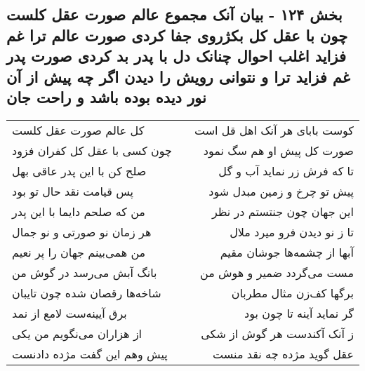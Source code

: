 \begin{center}
\section*{بخش ۱۲۴ - بیان آنک مجموع عالم صورت عقل کلست چون با عقل کل بکژروی جفا کردی صورت عالم ترا غم فزاید اغلب احوال چنانک دل با پدر بد کردی صورت پدر غم فزاید ترا و نتوانی رویش را دیدن اگر چه پیش از آن نور دیده بوده باشد و راحت جان}
\label{sec:sh124}
\begin{longtable}{l p{0.5cm} r}
کل عالم صورت عقل کلست
&&
کوست بابای هر آنک اهل قل است
\\
چون کسی با عقل کل کفران فزود
&&
صورت کل پیش او هم سگ نمود
\\
صلح کن با این پدر عاقی بهل
&&
تا که فرش زر نماید آب و گل
\\
پس قیامت نقد حال تو بود
&&
پیش تو چرخ و زمین مبدل شود
\\
من که صلحم دایما با این پدر
&&
این جهان چون جنتستم در نظر
\\
هر زمان نو صورتی و نو جمال
&&
تا ز نو دیدن فرو میرد ملال
\\
من همی‌بینم جهان را پر نعیم
&&
آبها از چشمه‌ها جوشان مقیم
\\
بانگ آبش می‌رسد در گوش من
&&
مست می‌گردد ضمیر و هوش من
\\
شاخه‌ها رقصان شده چون تایبان
&&
برگها کف‌زن مثال مطربان
\\
برق آیینه‌ست لامع از نمد
&&
گر نماید آینه تا چون بود
\\
از هزاران می‌نگویم من یکی
&&
ز آنک آکندست هر گوش از شکی
\\
پیش وهم این گفت مژده دادنست
&&
عقل گوید مژده چه نقد منست
\\
\end{longtable}
\end{center}
